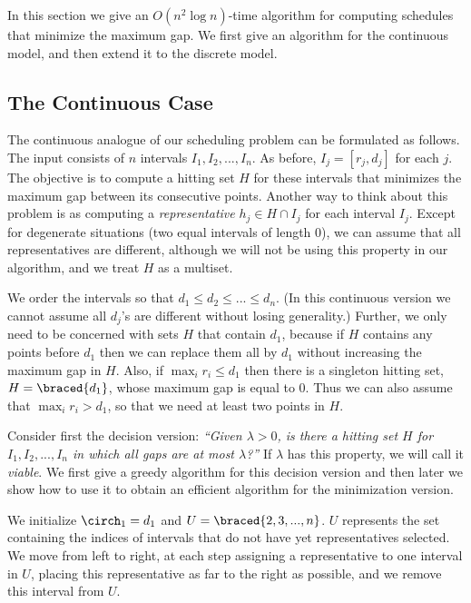 In this section we give an $O(n^2\log n)$-time algorithm for computing schedules
that minimize the maximum gap. We first give an algorithm for the
continuous model, and then extend it to the discrete model.



\subsection{The Continuous Case}

The continuous analogue of our scheduling problem can be formulated as follows. The input consists of $n$ intervals
$I_1,I_2,...,I_n$. As before, $I_j = [r_j,d_j]$ for each $j$.
The objective is to compute a hitting set $H$ for these intervals that
minimizes the maximum gap between its consecutive points. Another way to think about this problem is as computing a
\emph{representative} $h_j\in H\cap I_j$ for each interval $I_j$. Except for degenerate
situations (two equal intervals of length $0$), we can assume that
all representatives are different, although we will not be using this
property in our algorithm, and we treat $H$ as a multiset.

We order the intervals so that $d_1\le d_2 \le ... \le d_n$. (In this continuous version
we cannot assume all $d_j$'s are different without losing generality.) Further, we only need to
be concerned with sets $H$ that contain $d_1$, because if $H$ contains any points
before $d_1$ then we can replace them all by $d_1$ without increasing the maximum gap in $H$. 
Also, if $\max_i r_i\le d_1$ then there is a singleton hitting set, $H = \braced{d_1}$,
whose maximum gap is equal to $0$. Thus we can also assume
that $\max_i r_i > d_1$, so that we need at least two points in $H$.

Consider first the decision version: \emph{``Given $\lambda > 0$, is there a
hitting set $H$ for $I_1,I_2,...,I_n$ in which all gaps are at most $\lambda$?''}
If $\lambda$ has this property, we will call it \emph{viable}.
We first give a greedy algorithm for this decision version and
then later we show how to use it to obtain an efficient algorithm for the minimization version.



\medskip
{}
We initialize $\circh_1 = d_1$ and $U = \braced{2,3,...,n}$. $U$ represents the set containing  the
indices of intervals that do not have yet representatives selected.
We move from left to right, at each step assigning a representative to one
interval in $U$, placing this representative as far to the right as possible, and we remove this interval from $U$. 

